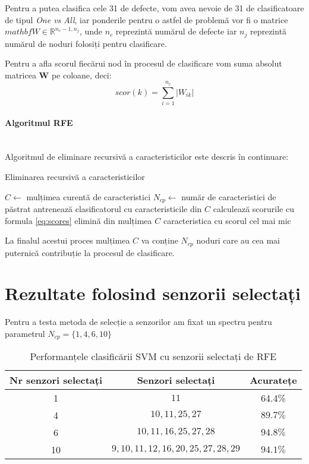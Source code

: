 Pentru a putea clasifica cele 31 de defecte, vom avea nevoie de 31 de clasificatoare de tipul \textit{One vs All}, iar ponderile pentru o astfel de problemă vor fi o matrice $mathbf{\textit{W}} \in \mathbb{R}^{n_{c}-1, n_{j}}$, unde $n_c$ reprezintă numărul de defecte iar $n_j$ reprezintă numărul de noduri folosiți pentru clasificare.

Pentru a afla scorul fiecărui nod în procesul de clasificare vom suma absolut matricea $\mathbf{W}$ pe coloane, deci:
\begin{equation}
    scor(k) = \sum_{i=1}^{n_c} |W_{ik}|
    \label{eq:scores}
\end{equation}

\paragraph{Algoritmul RFE} \mbox{} \\

Algoritmul de eliminare recursivă a caracteristicilor este descris în continuare:
\begin{algorithm2e}
\caption{Eliminarea recursivă a caracteristicilor}
\label{alg:rfe}
$C \leftarrow$ mulțimea curentă de caracteristici\;
$N_{cp} \leftarrow$ număr de caracteristici de păstrat\;
 {
    antrenează clasificatorul cu caracteristicile din $C$\;
    calculează scorurile cu formula \eqref{eq:scores}\;
    elimină din mulțimea $C$ caracteristica cu scorul cel mai mic
}
\end{algorithm2e}

La finalul acestui proces mulțimea $C$ va conține $N_{cp}$ noduri care au cea mai puternică contribuție la procesul de clasificare.

\section{Rezultate folosind senzorii selectați}

Pentru a testa metoda de selecție a senzorilor am fixat un spectru pentru parametrul $N_{cp} = \{1, 4, 6, 10\}$ 

\begin{table}
    \centering
    \begin{tabular}{|c|c|c|}
    \hline
        Nr senzori selectați & Senzori selectați & Acuratețe \\
        \hline
        1 & $11$ & 64.4\% \\
        \hline
        4 & $10, 11, 25, 27$ & $89.7\%$\\
        \hline
        6 & $10, 11, 16, 25, 27, 28$ & $94.8\%$\\
        \hline
        10 & $ 9, 10, 11, 12, 16, 20, 25, 27, 28, 29 $ & $94.1\%$ \\
        \hline
    \end{tabular}
    \caption{Performanțele clasificării SVM cu senzorii selectați de RFE}
    \label{tab:rfe_selected_sensors}
\end{table}


